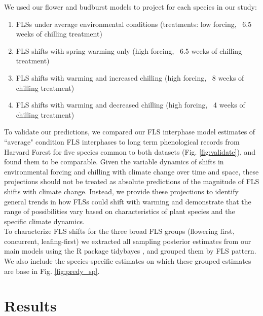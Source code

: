 \documentclass[11pt]{article}\usepackage[]{graphicx}\usepackage[]{color}
\begin{document}
\noindent We used our flower and budburst models to project for each species in our study:\\
\begin{enumerate}
\item FLSs under average environmental conditions  (treatments: low forcing, ~6.5 weeks of chilling treatment)
\item FLS shifts with spring warming only (high forcing, ~6.5 weeks of chilling treatment)
\item FLS shifts with warming and increased chilling (high forcing, ~8 weeks of chilling treatment)
\item FLS shifts with warming and decreased chilling (high forcing, ~4 weeks of chilling treatment)
\end{enumerate}

\noindent To validate our predictions, we compared our FLS interphase model estimates of ``average" condition FLS interphases to long term phenological records from Harvard Forest \citep{OKeefe2015} for five species common to both datasets (Fig. \ref{fig:validate}), and found them to be comparable. Given the variable dynamics of shifts in environmental forcing and chilling with climate change over time and space, these projections should not be treated as absolute predictions of the magnitude of FLS shifts with climate change. Instead, we provide these projections to identify general trends in how FLSs could shift with warming and demonstrate that the range of possibilities vary based on characteristics of plant species and the specific climate dynamics.\\

\noindent To characterize FLS shifts for the three broad FLS groups (flowering first, concurrent, leafing-first) we extracted all sampling posterior estimates from our main models using the R package tidybayes \citep{Kay2020}, and grouped them by FLS pattern. We also include the species-specific estimates on which these grouped estimates are base in Fig. \ref{fig:predy_sp}.  \\ 

\section*{Results} 
\end{document}
